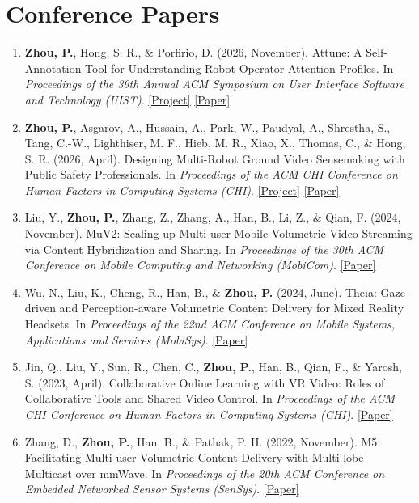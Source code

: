 \documentclass[10pt,letterpaper]{article}
\newenvironment{publications}{%
  \begin{enumerate}[label=\arabic*.,start=1,leftmargin=23pt,labelsep=8pt,itemsep=8pt,topsep=0pt,parsep=0pt]
  \interlinepenalty=10000
}{\end{enumerate}}
\begin{document}
\section{Conference Papers}
\begin{publications}
\item \textbf{Zhou, P.}, Hong, S. R., \& Porfirio, D. (2026, November).
Attune: A Self-Annotation Tool for Understanding Robot Operator Attention Profiles.
In \textit{Proceedings of the 39th Annual ACM Symposium on User Interface Software and Technology (UIST)}.
\href{https://ari-lab-gmu.github.io/Attune_UIST26/}{[Project]}
\href{https://ari-lab-gmu.github.io/Attune_UIST26/static/pdfs/paper.pdf}{[Paper]}

\item \textbf{Zhou, P.}, Asgarov, A., Hussain, A., Park, W., Paudyal, A., Shrestha, S., Tang, C.-W., Lighthiser, M. F., Hieb, M. R., Xiao, X., Thomas, C., \& Hong, S. R. (2026, April).
Designing Multi-Robot Ground Video Sensemaking with Public Safety Professionals.
In \textit{Proceedings of the ACM CHI Conference on Human Factors in Computing Systems (CHI)}.
\href{https://puqi7.github.io/MRVS_VideoSensemaking/}{[Project]}
\href{https://doi.org/10.1145/3772318.3790679}{[Paper]}

\item Liu, Y., \textbf{Zhou, P.}, Zhang, Z., Zhang, A., Han, B., Li, Z., \& Qian, F. (2024, November).
MuV2: Scaling up Multi-user Mobile Volumetric Video Streaming via Content Hybridization and Sharing.
In \textit{Proceedings of the 30th ACM Conference on Mobile Computing and Networking (MobiCom)}.
\href{https://doi.org/10.1145/3636534.3649364}{[Paper]}

\item Wu, N., Liu, K., Cheng, R., Han, B., \& \textbf{Zhou, P.} (2024, June).
Theia: Gaze-driven and Perception-aware Volumetric Content Delivery for Mixed Reality Headsets.
In \textit{Proceedings of the 22nd ACM Conference on Mobile Systems, Applications and Services (MobiSys)}.
\href{https://doi.org/10.1145/3643832.3661858}{[Paper]}

\item Jin, Q., Liu, Y., Sun, R., Chen, C., \textbf{Zhou, P.}, Han, B., Qian, F., \& Yarosh, S. (2023, April).
Collaborative Online Learning with VR Video: Roles of Collaborative Tools and Shared Video Control.
In \textit{Proceedings of the ACM CHI Conference on Human Factors in Computing Systems (CHI)}.
\href{https://doi.org/10.1145/3544548.3581395}{[Paper]}

\item Zhang, D., \textbf{Zhou, P.}, Han, B., \& Pathak, P. H. (2022, November).
M5: Facilitating Multi-user Volumetric Content Delivery with Multi-lobe Multicast over mmWave.
In \textit{Proceedings of the 20th ACM Conference on Embedded Networked Sensor Systems (SenSys)}.
\href{https://doi.org/10.1145/3560905.3568540}{[Paper]}
\end{publications}
\end{document}
